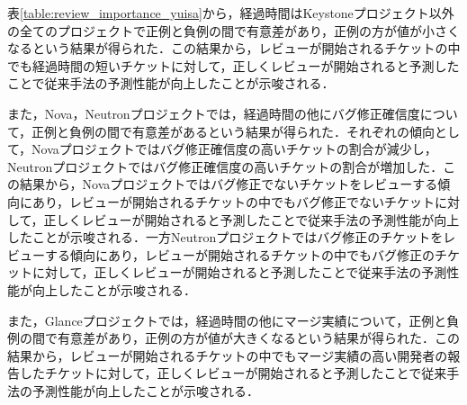 \documentclass[11pt]{jreport}
\begin{document}
表\ref{table:review_importance_yuisa}から，経過時間はKeystoneプロジェクト以外の全てのプロジェクトで正例と負例の間で有意差があり，正例の方が値が小さくなるという結果が得られた．この結果から，レビューが開始されるチケットの中でも経過時間の短いチケットに対して，正しくレビューが開始されると予測したことで従来手法の予測性能が向上したことが示唆される．

また，Nova，Neutronプロジェクトでは，経過時間の他にバグ修正確信度について，正例と負例の間で有意差があるという結果が得られた．それぞれの傾向として，Novaプロジェクトではバグ修正確信度の高いチケットの割合が減少し，Neutronプロジェクトではバグ修正確信度の高いチケットの割合が増加した．この結果から，Novaプロジェクトではバグ修正でないチケットをレビューする傾向にあり，レビューが開始されるチケットの中でもバグ修正でないチケットに対して，正しくレビューが開始されると予測したことで従来手法の予測性能が向上したことが示唆される．一方Neutronプロジェクトではバグ修正のチケットをレビューする傾向にあり，レビューが開始されるチケットの中でもバグ修正のチケットに対して，正しくレビューが開始されると予測したことで従来手法の予測性能が向上したことが示唆される．

また，Glanceプロジェクトでは，経過時間の他にマージ実績について，正例と負例の間で有意差があり，正例の方が値が大きくなるという結果が得られた．この結果から，レビューが開始されるチケットの中でもマージ実績の高い開発者の報告したチケットに対して，正しくレビューが開始されると予測したことで従来手法の予測性能が向上したことが示唆される．

\end{document}
